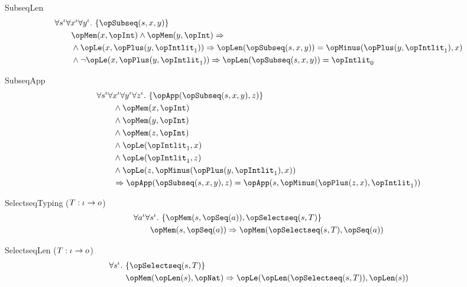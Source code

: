 \documentclass[11pt, a4paper, oneside]{article}
\begin{document}
\begin{axioms}
\item[SubseqLen] \[
        \begin{aligned}
            &\forall s^\idv \forall x^\idv \forall y^\idv.\, \st{ \opSubseq(s, x, y) } \\
            &\qquad \opMem(x, \opInt) \wedge \opMem(y, \opInt) \imp \\
            &\qquad \wedge \opLe(x, \opPlus(y, \opIntlit_1)) \imp \opLen(\opSubseq(s, x, y)) = \opMinus(\opPlus(y, \opIntlit_1), x) \\
            &\qquad \wedge \neg \opLe(x, \opPlus(y, \opIntlit_1)) \imp \opLen(\opSubseq(s, x, y)) = \opIntlit_0
        \end{aligned}
    \]

\item[SubseqApp] \[
        \begin{aligned}
            &\forall s^\idv \forall x^\idv \forall y^\idv \forall z^\idv.\, \st{ \opApp(\opSubseq(s, x, y), z) } \\
            &\qquad \wedge \opMem(x, \opInt) \\
            &\qquad \wedge \opMem(y, \opInt) \\
            &\qquad \wedge \opMem(z, \opInt) \\
            &\qquad \wedge \opLe(\opIntlit_1, x) \\
            &\qquad \wedge \opLe(\opIntlit_1, z) \\
            &\qquad \wedge \opLe(z, \opMinus(\opPlus(y, \opIntlit_1), x)) \\
            &\qquad \imp \opApp(\opSubseq(s, x, y), z) = \opApp(s, \opMinus(\opPlus(z, x), \opIntlit_1))
        \end{aligned}
    \]

\item[SelectseqTyping ($T : \iota \rightarrow o$)] \[
        \begin{aligned}
            &\forall a^\idv \forall s^\idv.\, \st{ \opMem(s, \opSeq(a)), \opSelectseq(s, T) } \\
            &\qquad \opMem(s, \opSeq(a)) \imp \opMem(\opSelectseq(s, T), \opSeq(a))
        \end{aligned}
    \]

\item[SelectseqLen ($T : \iota \rightarrow o$)] \[
        \begin{aligned}
            &\forall s^\idv.\, \st{ \opSelectseq(s, T) } \\
            &\qquad \opMem(\opLen(s), \opNat) \imp \opLe(\opLen(\opSelectseq(s, T)), \opLen(s))
        \end{aligned}
    \]


\end{axioms}
\end{document}
